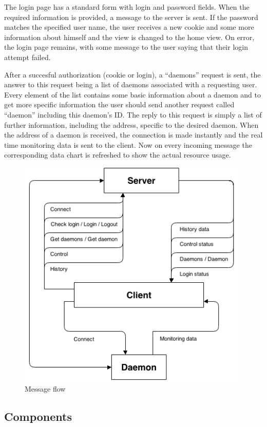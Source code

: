 \documentclass{l3proj}
\begin{document}
The login page has a standard form with login and password fields. When the required information is provided, a message to the server is sent. If the password matches the specified user name, the user receives a new cookie and some more information about himself and the view is changed to the home view. On error, the login page remains, with some message to the user saying that their login attempt failed.

After a succesful authorization (cookie or login), a ``daemons'' request is sent, the answer to this request being a list of daemons associated with a requesting user. Every element of the list contains some basic information about a daemon and to get more specific information the user should send another request called ``daemon'' including this daemon's ID. The reply to this request is simply a list of further information, including the address, specific to the desired daemon. When the address of a daemon is received, the connection is made instantly and the real time monitoring data is sent to the client. Now on every incoming message the corresponding data chart is refreshed to show the actual resource usage.

\begin{figure}[H]
\centering
\includegraphics[width=110mm]{images/messages.png}
\caption{Message flow}
\end{figure}

\subsection{Components}
\end{document}
